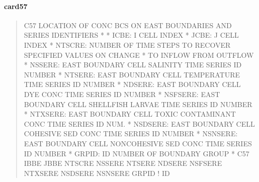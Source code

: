 \documentclass[letterpaper,10pt,english]{sphinxmanual}
\begin{document}
\paragraph{card57}
\label{\detokenize{inputfiles/runcontrol/card57:card57}}\label{\detokenize{inputfiles/runcontrol/card57::doc}}\begin{quote}

\begin{sphinxVerbatim}[commandchars=\\\{\}]
\PYGZhy{}\PYGZhy{}\PYGZhy{}\PYGZhy{}\PYGZhy{}\PYGZhy{}\PYGZhy{}\PYGZhy{}\PYGZhy{}\PYGZhy{}\PYGZhy{}\PYGZhy{}\PYGZhy{}\PYGZhy{}\PYGZhy{}\PYGZhy{}\PYGZhy{}\PYGZhy{}\PYGZhy{}\PYGZhy{}\PYGZhy{}\PYGZhy{}\PYGZhy{}\PYGZhy{}\PYGZhy{}\PYGZhy{}\PYGZhy{}\PYGZhy{}\PYGZhy{}\PYGZhy{}\PYGZhy{}\PYGZhy{}\PYGZhy{}\PYGZhy{}\PYGZhy{}\PYGZhy{}\PYGZhy{}\PYGZhy{}\PYGZhy{}\PYGZhy{}\PYGZhy{}\PYGZhy{}\PYGZhy{}\PYGZhy{}\PYGZhy{}\PYGZhy{}\PYGZhy{}\PYGZhy{}\PYGZhy{}\PYGZhy{}\PYGZhy{}\PYGZhy{}\PYGZhy{}\PYGZhy{}\PYGZhy{}\PYGZhy{}\PYGZhy{}\PYGZhy{}\PYGZhy{}\PYGZhy{}\PYGZhy{}\PYGZhy{}\PYGZhy{}\PYGZhy{}\PYGZhy{}\PYGZhy{}\PYGZhy{}\PYGZhy{}\PYGZhy{}\PYGZhy{}\PYGZhy{}\PYGZhy{}\PYGZhy{}\PYGZhy{}\PYGZhy{}\PYGZhy{}\PYGZhy{}\PYGZhy{}
C57 LOCATION OF CONC BC\PYGZsq{}S ON EAST BOUNDARIES AND SERIES IDENTIFIERS
*
*  ICBE:    I CELL INDEX
*  JCBE:    J CELL INDEX
*  NTSCRE:  NUMBER OF TIME STEPS TO RECOVER SPECIFIED VALUES ON CHANGE
*           TO INFLOW FROM OUTFLOW
*  NSSERE:  EAST BOUNDARY CELL SALINITY TIME SERIES ID NUMBER
*  NTSERE:  EAST BOUNDARY CELL TEMPERATURE TIME SERIES ID NUMBER
*  NDSERE:  EAST BOUNDARY CELL DYE CONC TIME SERIES ID NUMBER
*  NSFSERE: EAST BOUNDARY CELL SHELLFISH LARVAE TIME SERIES ID NUMBER
*  NTXSERE: EAST BOUNDARY CELL TOXIC CONTAMINANT CONC TIME SERIES ID NUM.
*  NSDSERE: EAST BOUNDARY CELL COHESIVE SED CONC TIME SERIES ID NUMBER
*  NSNSERE: EAST BOUNDARY CELL NON\PYGZhy{}COHESIVE SED CONC TIME SERIES ID NUMBER
*    GRPID: ID NUMBER OF BOUNDARY GROUP
*
C57    IBBE    JBBE  NTSCRE  NSSERE  NTSERE  NDSERE NSFSERE NTXSERE NSDSERE NSNSERE      GRPID ! ID
\end{sphinxVerbatim}
\end{quote}
\end{document}
